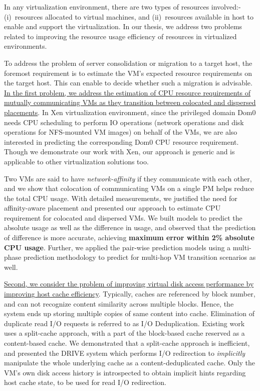 
In any virtualization environment, there are two types of resources
involved:- (i)~resources allocated to virtual machines, and
(ii)~resources available in host to enable and support the virtualization.
In our thesis, we address two problems related to improving 
the resource usage efficiency of resources in virtualized environments.

To address the problem of server consolidation or migration to
a target host,
the foremost requirement is to estimate the VM's expected resource
requirements on the target host. This can enable to decide whether
such a migration is advisable.
\ul{In the first problem, 
we address the estimation of CPU resource requirements
of mutually communicating VMs as they transition between colocated
and dispersed placements}.
In Xen virtualization environment, since the privileged
domain Dom0 needs CPU scheduling to perform IO operations
(network operations and disk operations for NFS-mounted
VM images) on behalf of the VMs, we are also interested in predicting the
corresponding Dom0 CPU resource requirement.
Though we demonstrate our work with Xen, our approach is generic and
is applicable to other virtualization solutions too.

Two VMs are said to have \textit{network-affinity} if they 
communicate with each other, and we show that colocation
of communicating VMs on a single PM helps reduce the total CPU usage.
With detailed measurements, we justified the need for
affinity-aware placement and presented our approach to estimate
CPU requirement for colocated and dispersed VMs. We built models to
predict the absolute usage as well as the difference in usage, and
observed that the prediction of difference is more accurate,
achieving \textbf{maximum error within 2\% absolute CPU usage}.
Further, we applied the pair-wise prediction models using a
multi-phase prediction methodology to predict for multi-hop VM 
transition scenarios as well.

\ul{Second, we consider the problem of improving virtual 
disk access performance by improving host cache efficiency}. 
Typically, caches are referenced by block number, 
and can not recognize content similarity
across multiple blocks. Hence, the system ends up storing
multiple copies of same content into cache.
Elimination of duplicate read I/O requests is referred to as I/O Deduplication.
Existing work uses a split-cache approach, with a part of the block-based
cache reserved as a content-based cache. We demonstrated
that a split-cache approach is inefficient, and presented the
DRIVE system which performs I/O
redirection to \textit{implicitly} manipulate the whole underlying cache as
a content-deduplicated cache. Only the VM's own disk access history is
introspected to obtain implicit hints regarding host cache state, to be used
for read I/O redirection.

